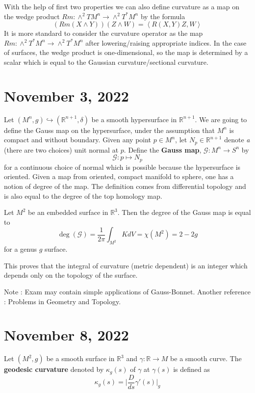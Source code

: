 \documentclass[12pt,a4paper]{article}
\theoremstyle{definition}
\theoremstyle{greenbox}
\newcommand{\R}{\mathbb{R}}
\newcommand{\Rn}{\mathbb{R}^{n+1}}
\begin{document}
    With the help of first two properties we can also define curvature as a map on the wedge product $ Rm : \wedge^{2}TM^{n} \to \wedge^{2}T^{*}M^{n}  $ by the formula 
    \[ (Rm(X \wedge Y))(Z \wedge W) = \left<  R(X,Y)Z,W\right>  \]
    It is more standard to consider the curvature operator as the map $ Rm : \wedge^{2}T^{*}M^{n} \to \wedge^{2}T^{*}M^{n}$ after lowering/raising appropriate indices. In the case of surfaces, the wedge product is one-dimensional, so the map is determined by a scalar which is equal to the Gaussian curvature/sectional curvature. 

    \section{November 3, 2022}

    Let $ (M^{n},g)  \hookrightarrow (\Rn, \delta)$ be a smooth hypersurface in $ \Rn $. We are going to define the Gauss map on the hypersurface, under the assumption that $ M^{n} $  is compact and without boundary. Given any point $ p \in M^{n} $, let $ N_{p} \in \Rn $ denote \textit{a} (there are two choices) unit normal at $ p $. Define the \textbf{Gauss map}, $ \mathcal{G} : M^{n} \to S^{n} $ by 
    \[ \mathcal{G} : p \mapsto N_{p}  \]
    for a continuous choice of normal which is possible because the hypersurface is oriented. Given a map from oriented, compact manifold to sphere, one has a notion of degree of the map. The definition comes from differential topology and is also equal to the degree of the top homology map. 
    \newpage
    \begin{thm}
        Let $ M^2 $ be an embedded surface in $ \R^{3} $. Then the degree of the Gauss map is equal to 
        \[ \deg( \mathcal{G}) = \frac{1}{2 \pi} \int_{M^{2}}K dV  = \chi(M^{2}) = 2-2g\]
        for a genus $ g $ surface.
    \end{thm}
    \begin{remark}
        This proves that the integral of curvature (metric dependent) is an integer which depends only on the topology of the surface.
    \end{remark}
    Note : Exam may contain simple applications of Gauss-Bonnet.
    Another reference : Problems in Geometry and Topology.

    \section{November 8, 2022}

    Let $ (M^{2},g) $ be a smooth surface in $ \R^{3} $ and $ \gamma : \R \to M $ be a smooth curve. The \textbf{geodesic curvature} denoted by $ \kappa_{g}(s) $ of $ \gamma $ at $ \gamma(s) $ is defined as
    \[ \kappa_{g}(s) = \bigg| \frac{D}{ds}\gamma'(s)\bigg|_{g} \]
     
\end{document}
